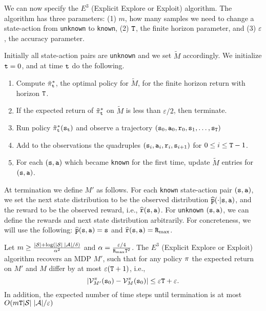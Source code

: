 We can now specify the $E^3$ (Explicit Explore or Exploit)
algorithm. The algorithm has three parameters: (1) $m$, how many
samples we need to change a state-action from \texttt{unknown} to \texttt{known}, (2)
${\tt T}$, the finite horizon parameter, and (3) $\varepsilon$, the
accuracy parameter.

Initially all state-action pairs are \texttt{unknown} and we set $\widetilde{M}$
accordingly. We initialize ${\tt t}=0$, and at time ${\tt t}$ do the
following.
\begin{enumerate}
\item
Compute $\tilde{\pi}^*_{\tt t}$, the optimal policy for
$\widetilde{M}$, for the finite horizon return with horizon ${\tt T}$.
\item
If the expected return of $\tilde{\pi}^*_{\tt t}$ on $\widetilde{M}$
is less than $\varepsilon/2$, then terminate.
\item
Run policy $\tilde{\pi}^*_{\tt t}({\tt s}_{{\tt t}})$ and observe a trajectory $({\tt s}_0,{\tt a}_0,{\tt r}_0,{\tt s}_1, \ldots, {\tt s}_{\tt T})$
\item
Add to the observations the quadruples
$({\tt s}_i,{\tt a}_i,{\tt r}_i,{\tt s}_{i+1})$
for $0\leq i\leq {\tt T}-1$.
\item
For each $({\tt s},{\tt a})$ which became \texttt{known} for the first time,
update $\widetilde{M}$ entries for $({\tt s},{\tt a})$.
\end{enumerate}

At termination we define $M'$ as follows. For each \texttt{known} state-action pair
$({\tt s},{\tt a})$, we set the next state distribution to be the
observed distribution $\widehat{{\tt p}}(\cdot|{\tt s},{\tt a})$, and the
reward to be the observed reward, i.e.,
$\widehat{{\tt r}}({\tt s},{\tt a})$.
%
For \texttt{unknown} $({\tt s},{\tt a})$, we can define the rewards and next
state distribution arbitrarily. For concreteness, we will use the
following: $\widehat{{\tt p}}({\tt s},{\tt a})={\tt s}$ and
$\widehat{{\tt r}}({\tt s},{\tt a})={\tt R}_{\max }$.

\begin{theorem}
Let $m\geq
\frac{|\mathcal{S}|+\log(|\mathcal{S}|\;|\mathcal{A}|/\delta)}{\alpha^2}$
and $\alpha=\frac{\varepsilon/4}{{\tt R}_{\max } {\tt T}^2}$.
%
The $E^3$ (Explicit Explore or Exploit) algorithm recovers an MDP
$M'$, such that for any policy $\pi$ the expected return on $M'$
and $M$ differ by at most $\varepsilon({\tt T}+1)$, i.e.,
$$|\mathcal{V}^\pi_{M'}({\tt s}_0)-\mathcal{V}^\pi_M({\tt s}_0) |\leq
\varepsilon{\tt T}+\varepsilon. $$
 In addition, the expected number of time
steps until termination is at most $O(m{\tt T}
|\mathcal{S}|\;|\mathcal{A}|/\varepsilon)$
\end{theorem}

